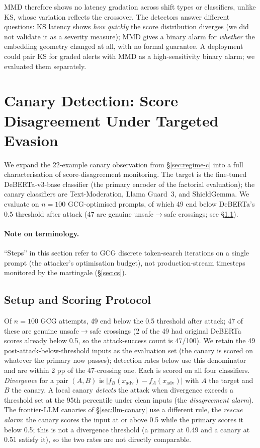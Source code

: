 \documentclass{article}
\begin{document}
MMD therefore shows no latency gradation across shift types or classifiers, unlike KS, whose variation reflects the crossover. The detectors answer different questions: KS latency shows \emph{how quickly} the score distribution diverges (we did not validate it as a severity measure); MMD gives a binary alarm for \emph{whether} the embedding geometry changed at all, with no formal guarantee. A deployment could pair KS for graded alerts with MMD as a high-sensitivity binary alarm; we evaluated them separately.

\section{Canary Detection: Score Disagreement Under Targeted Evasion}
\label{sec:canary}

We expand the 22-example canary observation from \S\ref{sec:regime-c} into a full characterisation of score-disagreement monitoring. The target is the fine-tuned DeBERTa-v3-base classifier (the primary encoder of the factorial evaluation); the canary classifiers are Text-Moderation, Llama Guard~3, and ShieldGemma. We evaluate on $n=100$ GCG-optimised prompts, of which 49 end below DeBERTa's 0.5 threshold after attack (47 are genuine unsafe$\rightarrow$safe crossings; see \S\ref{sec:canary-setup}).

\paragraph{Note on terminology.} ``Steps'' in this section refer to GCG discrete token-search iterations on a single prompt (the attacker's optimisation budget), not production-stream timesteps monitored by the martingale (\S\ref{sec:cs}).

\subsection{Setup and Scoring Protocol}
\label{sec:canary-setup}

Of $n = 100$ GCG attempts, 49 end below the 0.5 threshold after attack; 47 of these are genuine unsafe$\rightarrow$safe crossings (2 of the 49 had original DeBERTa scores already below 0.5, so the attack-success count is 47/100). We retain the 49 post-attack-below-threshold inputs as the evaluation set (the canary is scored on whatever the primary now passes); detection rates below use this denominator and are within 2 pp of the 47-crossing one. Each is scored on all four classifiers. \emph{Divergence} for a pair $(A, B)$ is $|f_B(x_{\text{adv}}) - f_A(x_{\text{adv}})|$ with $A$ the target and $B$ the canary. A local canary \emph{detects} the attack when divergence exceeds a threshold set at the 95th percentile under clean inputs (the \emph{disagreement alarm}). The frontier-LLM canaries of \S\ref{sec:llm-canary} use a different rule, the \emph{rescue alarm}: the canary scores the input at or above 0.5 while the primary scores it below 0.5; this is not a divergence threshold (a primary at 0.49 and a canary at 0.51 satisfy it), so the two rates are not directly comparable.
\end{document}
